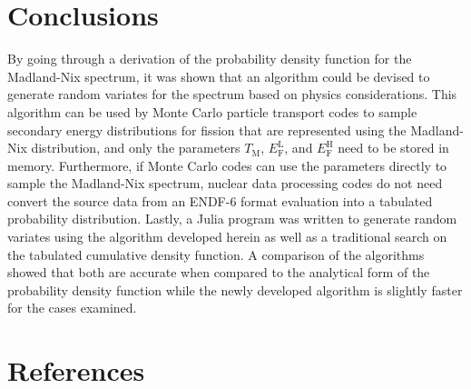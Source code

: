 \documentclass[3p,fleqn]{elsarticle}
\newcommand{\tmax}{T_{\mathrm{M}}}
\newcommand{\efl}{E_{\mathrm{F}}^{\mathrm{L}}}
\newcommand{\efh}{E_{\mathrm{F}}^{\mathrm{H}}}
\begin{document}
\section{Conclusions}

By going through a derivation of the probability density function for the
Madland-Nix spectrum, it was shown that an algorithm could be devised to
generate random variates for the spectrum based on physics considerations. This
algorithm can be used by Monte Carlo particle transport codes to sample
secondary energy distributions for fission that are represented using the
Madland-Nix distribution, and only the parameters $\tmax$, $\efl$, and $\efh$
need to be stored in memory. Furthermore, if Monte Carlo codes can use the
parameters directly to sample the Madland-Nix spectrum, nuclear data processing
codes do not need convert the source data from an ENDF-6 format evaluation into
a tabulated probability distribution. Lastly, a Julia program was written to
generate random variates using the algorithm developed herein as well as a
traditional search on the tabulated cumulative density function. A comparison
of the algorithms showed that both are accurate when compared to the analytical
form of the probability density function while the newly developed algorithm is
slightly faster for the cases examined.

\section*{References}



\end{document}
